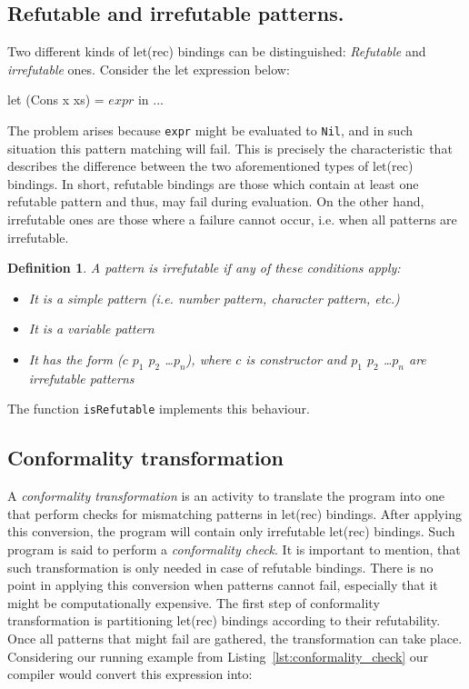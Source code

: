 \documentclass[12pt,a4paper]{report}
\newtheorem{definition}{Definition}[chapter]
\begin{document}
\subsection{Refutable and irrefutable patterns.}
\label{sec:irrefutable_patterns}
Two different kinds of let(rec) bindings can be distinguished:
\textit{Refutable} and \textit{irrefutable} ones. Consider the let expression
below:

\vspace*{0.2in}
\begin{code}[style=haskell,mathescape=true,label=lst:conformality_check,caption={Pattern matching let binding.}]
let (Cons x xs) = $expr$ in ...
\end{code}

The problem arises because \texttt{expr} might be evaluated to \texttt{Nil},
and in such situation this pattern matching will fail. This is precisely the
characteristic that describes the difference between the two aforementioned
types of let(rec) bindings. In short, refutable bindings are those which contain
at least one refutable pattern and thus, may fail during evaluation. On the
other hand, irrefutable ones are those where a failure cannot occur, i.e. when
all patterns are irrefutable.

\begin{definition}
  \label{def:irrefutable_pattern}
  A pattern is irrefutable if any of these conditions apply:
  \begin{itemize}
    \item It is a simple pattern (i.e. number pattern, character pattern, etc.)
    \item It is a variable pattern
    \item It has the form ($c$ $p_{1}$ $p_{2}$ \ldots $p_{n}$), where $c$ is
      constructor and $p_{1}$ $p_{2}$ \ldots $p_{n}$ are irrefutable patterns
  \end{itemize}
\end{definition}
The function \texttt{isRefutable} implements this behaviour.

\subsection{Conformality transformation}
\label{sec:conformality_transformation}
A \textit{conformality transformation} is an activity to translate the program
into one that perform checks for mismatching patterns in let(rec) bindings.
After applying this conversion, the program will contain only irrefutable
let(rec) bindings. Such program is said to perform a \textit{conformality
check}. It is important to mention, that such transformation is only needed in
case of refutable bindings. There is no point in applying this conversion when
patterns cannot fail, especially that it might be computationally expensive.
The first step of conformality transformation is partitioning let(rec) bindings
according to their refutability. Once all patterns that might fail are
gathered, the transformation can take place. Considering our running example
from Listing~\ref{lst:conformality_check} our compiler would convert this
expression into:
\end{document}
